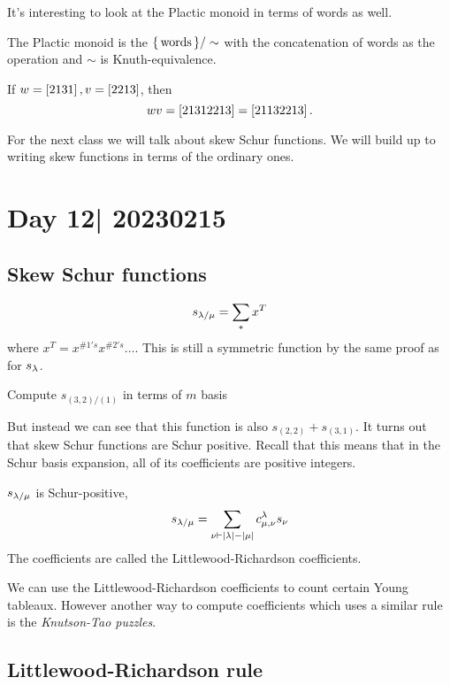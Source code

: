 \documentclass[12pt]{memoir}
\begin{document}
It's interesting to look at the Plactic monoid in terms of words as well. 

\begin{Def}
    The Plactic monoid is the $\{\,\text{words}\,\}/\sim$ with the concatenation of words as the operation and $\sim$ is Knuth-equivalence.
\end{Def}

\begin{Ex}
    If $w=\left\lbrack2131\right\rbrack,v=[2213]$, then 
    $$wv=\left\lbrack21312213\right\rbrack=\left\lbrack21132213\right\rbrack.$$
\end{Ex}

For the next class we will talk about skew Schur functions. We will build up to writing skew functions in terms of the ordinary ones.

\section{Day 12| 20230215}

\subsection{Skew Schur functions}

\begin{Def}
    $$s_{\lambda/\mu}=\sum_{\ast}x^T$$
    where $x^T=x^{\# 1's}x^{\# 2's}\dots$. This is still a symmetric function by the same proof as for $s_\lambda$.
\end{Def}

\begin{Ex}
    Compute $s_{(3,2)/(1)}$ in terms of $m$ basis 
\end{Ex}

But instead we can see that this function is also $s_{(2,2)}+s_{(3,1)}$. It turns out that skew Schur functions are Schur positive. Recall that this means that in the Schur basis expansion, all of its coefficients are positive integers.

\begin{Th}
    $s_{\lambda/\mu}$ is Schur-positive,
    $$s_{\lambda/\mu}=\sum_{\nu\vdash|\lambda|-|\mu|}c^{\lambda}_{\mu,\nu}s_\nu$$
    The coefficients are called the Littlewood-Richardson coefficients.
\end{Th}

We can use the Littlewood-Richardson coefficients to count certain Young tableaux. However another way to compute coefficients which uses a similar rule is the \emph{Knutson-Tao puzzles}.

\subsection{Littlewood-Richardson rule}
\end{document}
